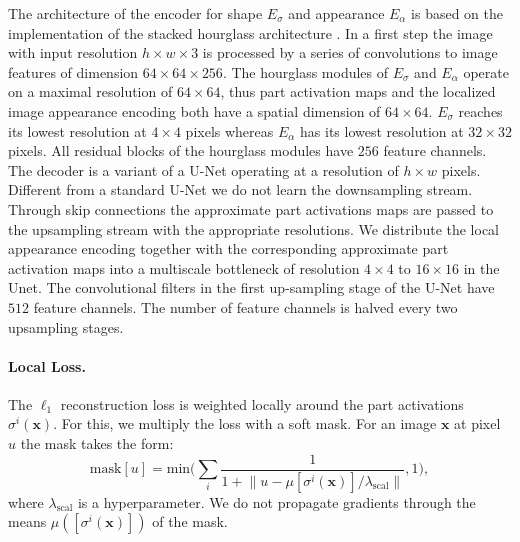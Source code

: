 	The architecture of the encoder for shape $E_{\sigma}$ and appearance $E_{\alpha}$ is based on the implementation %
	of the stacked hourglass architecture \cite{newell16hourglass}.
	In a first step the image with input resolution $h \times w \times 3$ is processed by a series of convolutions to image features of dimension $64 \times 64 \times 256$.
	The hourglass modules of $E_{\sigma}$ and $E_{\alpha}$ operate on a maximal resolution of $64 \times 64$, thus part activation maps and the localized image appearance encoding both have a spatial dimension of $64 \times 64$.
	$E_{\sigma}$ reaches its lowest resolution at $4 \times 4$ pixels whereas $E_{\alpha}$ has its lowest resolution at $32 \times 32$ pixels.
	All residual blocks of the hourglass modules have $256$ feature channels.
	The decoder is a variant of a U-Net \cite{ronneberger15unet} operating at a resolution of $h \times w$ pixels.
	Different from a standard U-Net we do not learn the downsampling stream.
	Through skip connections the approximate part activations maps are passed to the upsampling stream with the appropriate resolutions.
	We distribute the local appearance encoding together with the corresponding approximate part activation maps into a multiscale bottleneck of resolution $4 \times 4$ to $16 \times 16$ in the Unet.
	The convolutional filters in the first up-sampling stage of the U-Net have $512$ feature channels.
	The number of feature channels is halved every two upsampling stages.
	\\
\paragraph{Local Loss.}
	The $\ell_1$ reconstruction loss is weighted locally around the part activations $\sigma^i(\mathbf{x})$. For this, we multiply the loss with a soft mask. %
	For an image $\mathbf{x}$ at pixel $u$ the mask takes the form:
	\begin{equation}
		\textrm{mask}[u] = \text{min}\big(\sum_i  \frac{1}{1 + \lVert u -  \mu[\sigma^i(\mathbf{x})]/\lambda_\text{scal} \rVert}, 1\big),
	\end{equation}
	where $\lambda_\text{scal}$ is a hyperparameter.
	We do not propagate gradients through the means $\mu([\sigma^i(\mathbf{x})])$ of the mask.\\





